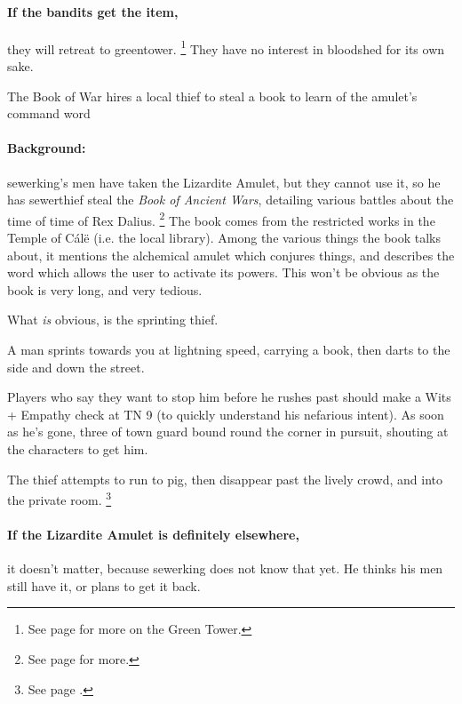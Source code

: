 \begin{multicols}{2}
\paragraph{If the bandits get the item,} they will retreat to \gls{greentower}.%
\footnote{See page \pageref{green_tower} for more on the Green Tower.}
They have no interest in bloodshed for its own sake.

{The Book of War}%
{ hires a local thief to steal a book to learn of the amulet's command word}%

\paragraph{Background:}
\Gls{sewerking}'s men have taken the Lizardite Amulet, but they cannot use it, so he has \gls{sewerthief} steal the \textit{Book of Ancient Wars}, detailing various battles about the time of time of Rex Dalius.%
\footnote{See page \pageref{h_dalius} for more.}
The book comes from the restricted works in the Temple of C\'{a}l\"{e} (i.e. the local library).
Among the various things the book talks about, it mentions the alchemical amulet which conjures things, and describes the word which allows the user to activate its powers.
This won't be obvious as the book is very long, and very tedious.

What \emph{is} obvious, is the sprinting thief.

\begin{boxtext}

  A man sprints towards you at lightning speed, carrying a book, then darts to the side and down the street.

\end{boxtext}

Players who say they want to stop him before he rushes past should make a Wits + Empathy check at TN 9 (to quickly understand his nefarious intent).
As soon as he's gone, three of \gls{town} \gls{guard} bound round the corner in pursuit, shouting at the characters to get him.

The thief attempts to run to \gls{pig}, then disappear past the lively crowd, and into the private room.%
\footnote{See page \pageref{pigPrivate}.}

\sewerthief

\paragraph{If the Lizardite Amulet is definitely elsewhere,}
it doesn't matter, because \gls{sewerking} does not know that yet.
He thinks his men still have it, or plans to get it back.


\end{multicols}
